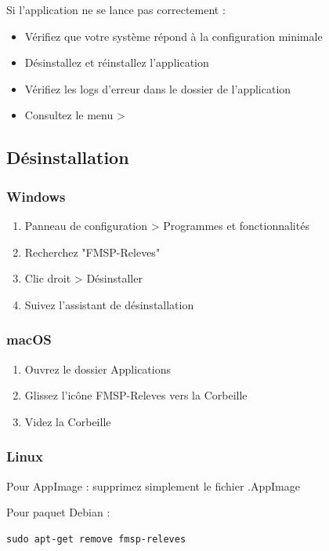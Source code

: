 \begin{tcolorbox}[colback=red!5!white,colframe=red!75!black,title=En cas de problème au démarrage]
Si l'application ne se lance pas correctement :
\begin{itemize}[leftmargin=*]
    \item Vérifiez que votre système répond à la configuration minimale
    \item Désinstallez et réinstallez l'application
    \item Vérifiez les logs d'erreur dans le dossier de l'application
    \item Consultez le menu  > 
\end{itemize}
\end{tcolorbox}

\subsection{Désinstallation}

\subsubsection{Windows}

\begin{enumerate}[leftmargin=*]
    \item Panneau de configuration > Programmes et fonctionnalités
    \item Recherchez "FMSP-Releves"
    \item Clic droit > Désinstaller
    \item Suivez l'assistant de désinstallation
\end{enumerate}

\subsubsection{macOS}

\begin{enumerate}[leftmargin=*]
    \item Ouvrez le dossier Applications
    \item Glissez l'icône FMSP-Releves vers la Corbeille
    \item Videz la Corbeille
\end{enumerate}

\subsubsection{Linux}

Pour AppImage : supprimez simplement le fichier .AppImage

Pour paquet Debian :
\begin{verbatim}
sudo apt-get remove fmsp-releves
\end{verbatim}


\newpage
